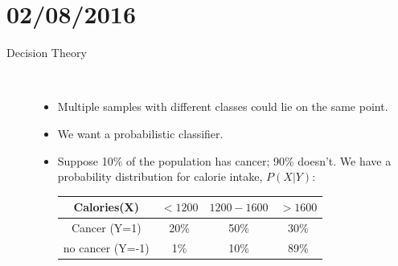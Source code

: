 \documentclass[10pt]{article}
\begin{document}
\section*{02/08/2016}
\begin{description}
	\item[Decision Theory]
	\
	\begin{itemize}
		\item Multiple samples with different classes could lie on the same point.
		\item We want a probabilistic classifier.
		\item Suppose 10\% of the population has cancer; 90\% doesn't. We have a probability distribution for calorie intake, $P(X|Y)$:
		\begin{center}
			\begin{tabular}{| c | c | c | c |}
				\hline
 				Calories(X) & $< 1200$ & $1200 - 1600$ & $> 1600$\\
 				\hline
 				Cancer (Y=1) & 20\% & 50\% & 30\%\\
 				\hline
 				no cancer (Y=-1) & 1\% & 10\% & 89\%\\
 				\hline
			\end{tabular}
		\end{center}
	

\end{itemize}
\end{description}
\end{document}
